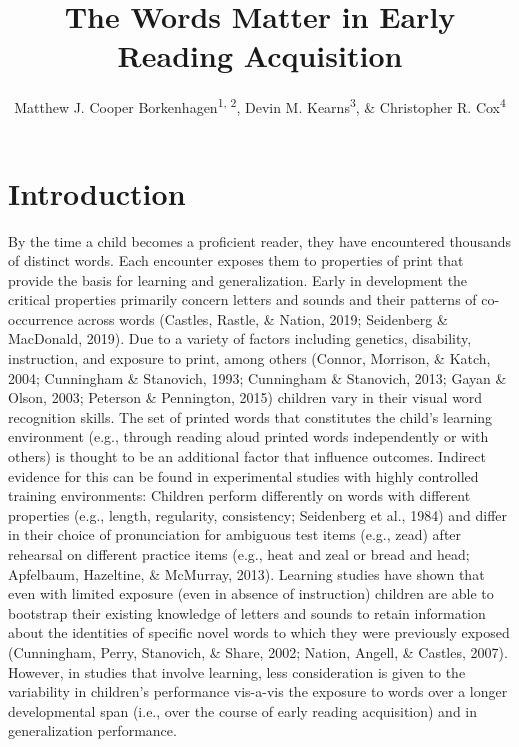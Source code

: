 \documentclass[
  ,man,floatsintext]{apa6}
\title{The Words Matter in Early Reading Acquisition}
\author{Matthew J. Cooper Borkenhagen\textsuperscript{1, 2}, Devin M. Kearns\textsuperscript{3}, \& Christopher R. Cox\textsuperscript{4}}
\date{}
\affiliation{\vspace{0.5cm}\textsuperscript{1} Florida State University\\\textsuperscript{2} The Florida Center for Reading Research\\\textsuperscript{3} North Carolina State University\\\textsuperscript{4} Louisiana State University}
\begin{document}
\maketitle

\section{Introduction}\label{introduction}

By the time a child becomes a proficient reader, they have encountered thousands of distinct words. Each encounter exposes them to properties of print that provide the basis for learning and generalization. Early in development the critical properties primarily concern letters and sounds and their patterns of co-occurrence across words (Castles, Rastle, \& Nation, 2019; Seidenberg \& MacDonald, 2019). Due to a variety of factors including genetics, disability, instruction, and exposure to print, among others (Connor, Morrison, \& Katch, 2004; Cunningham \& Stanovich, 1993; Cunningham \& Stanovich, 2013; Gayan \& Olson, 2003; Peterson \& Pennington, 2015) children vary in their visual word recognition skills. The set of printed words that constitutes the child's learning environment (e.g., through reading aloud printed words independently or with others) is thought to be an additional factor that influence outcomes. Indirect evidence for this can be found in experimental studies with highly controlled training environments: Children perform differently on words with different properties (e.g., length, regularity, consistency; Seidenberg et al., 1984) and differ in their choice of pronunciation for ambiguous test items (e.g., zead) after rehearsal on different practice items (e.g., heat and zeal or bread and head; Apfelbaum, Hazeltine, \& McMurray, 2013). Learning studies have shown that even with limited exposure (even in absence of instruction) children are able to bootstrap their existing knowledge of letters and sounds to retain information about the identities of specific novel words to which they were previously exposed (Cunningham, Perry, Stanovich, \& Share, 2002; Nation, Angell, \& Castles, 2007). However, in studies that involve learning, less consideration is given to the variability in children's performance vis-a-vis the exposure to words over a longer developmental span (i.e., over the course of early reading acquisition) and in generalization performance.
\end{document}
